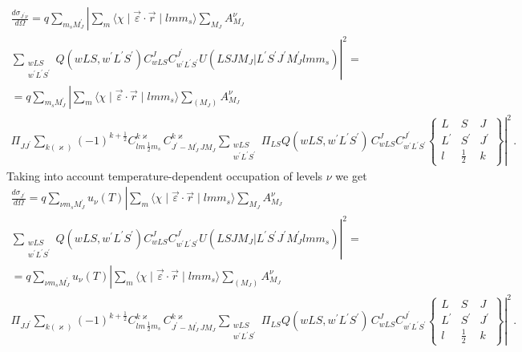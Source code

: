 \documentclass[a4paper,oneside,12pt]{extarticle}
\begin{document}
\begin{multline}
\frac{d \sigma_{J^{\prime}\nu}}{d \Omega} = q \sum_{m_s M_J^{\prime}} 
\left| \sum_m \langle \chi \mid \vec{\varepsilon} \cdot \vec{r}  \mid lmm_s \rangle 
\sum_{M_J} A^{\nu}_{M_J} \right. \\
\left. 
\sum_{\substack{wLS \\w^{\prime}L^{\prime} S^{\prime} }} Q(wLS,w^{\prime}L^{\prime} S^{\prime})
C^J_{wLS} C^{J^{\prime}}_{w^{\prime}L^{\prime} S^{\prime}}
U(L S J M_J | L^{\prime} S^{\prime} J^{\prime} M_J^{\prime} l m m_s) \right|^2 = \\ =
q \sum_{m_s M_J^{\prime}} 
\left| \sum_m \langle \chi \mid \vec{\varepsilon} \cdot \vec{r}  \mid lmm_s \rangle 
\sum_{(M_J)} A^{\nu}_{M_J} \right. \\
\left. 
\Pi_{JJ^{\prime}} \sum_{k (\varkappa)}
(-1)^{k+\frac{1}{2}}
C^{k\varkappa}_{lm \, \frac{1}{2}m_s} \,
C^{k\varkappa}_{J^{\prime} -M_J^{\prime} \, J M_J} 
\sum_{\substack{wLS\\w^{\prime}L^{\prime} S^{\prime}}} \Pi_{LS}
Q(wLS,w^{\prime}L^{\prime} S^{\prime}) \, 
C^J_{wLS} C^{J^{\prime}}_{w^{\prime}L^{\prime} S^{\prime}}
\left \{
\begin{array}{ccc}
L & S & J \\
L^{\prime} & S^{\prime} & J^{\prime} \\
l & \frac{1}{2} & k
\end{array}
\right \}
\right|^2 \,.
\end{multline}
%
Taking into account temperature-dependent occupation of levels $\nu$ we get
%
\begin{multline}
\frac{d \sigma_{J^{\prime}}}{d \Omega} = q \sum_{\nu m_s M_J^{\prime}} u_{\nu}(T)
\left| \sum_m \langle \chi \mid \vec{\varepsilon} \cdot \vec{r}  \mid lmm_s \rangle 
\sum_{M_J} A^{\nu}_{M_J} \right. \\
\left. 
\sum_{\substack{wLS \\w^{\prime}L^{\prime} S^{\prime} }} Q(wLS,w^{\prime}L^{\prime} S^{\prime})
C^J_{wLS} C^{J^{\prime}}_{w^{\prime}L^{\prime} S^{\prime}}
U(L S J M_J | L^{\prime} S^{\prime} J^{\prime} M_J^{\prime} l m m_s) \right|^2 = \\ =
q \sum_{\nu m_s M_J^{\prime}} u_{\nu}(T)
\left| \sum_m \langle \chi \mid \vec{\varepsilon} \cdot \vec{r}  \mid lmm_s \rangle 
\sum_{(M_J)} A^{\nu}_{M_J} \right. \\
\left. 
\Pi_{JJ^{\prime}} \sum_{k (\varkappa)}
(-1)^{k+\frac{1}{2}}
C^{k\varkappa}_{lm \, \frac{1}{2}m_s} \,
C^{k\varkappa}_{J^{\prime} -M_J^{\prime} \, J M_J} 
\sum_{\substack{wLS\\w^{\prime}L^{\prime} S^{\prime}}} \Pi_{LS}
Q(wLS,w^{\prime}L^{\prime} S^{\prime}) \, 
C^J_{wLS} C^{J^{\prime}}_{w^{\prime}L^{\prime} S^{\prime}}
\left \{
\begin{array}{ccc}
L & S & J \\
L^{\prime} & S^{\prime} & J^{\prime} \\
l & \frac{1}{2} & k
\end{array}
\right \}
\right|^2 \,.
\end{multline}
\end{document}
